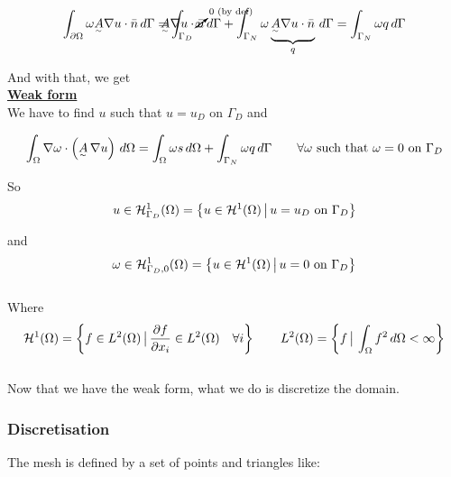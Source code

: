 \[
  \int_{\partial\Omega} \omega\subTilde{A}\nabla u\cdot\Bar{n} \,d\Gamma = \int_{\Gamma_D} \cancelto{^{\footnotesize{\scriptstyle{0} \text{ (by def)}}}}{\omega} \hspace{-1.2cm}\subTilde{A}\nabla u\cdot\Bar{n} \,d\Gamma + \int_{\Gamma_N} \omega\underbrace{\subTilde{A}\nabla u\cdot\Bar{n}}_{q} \,d\Gamma = \int_{\Gamma_N} \omega q \, d\Gamma
\]

And with that, we get \\

\underline{\textbf{Weak form}} \\

We have to find $u$ such that $u = u_D$ on $\Gamma_D$ and 

\[
  \int_{\Omega} \nabla\omega\cdot\left(\underset{^\sim}{A}\,\nabla u\right)\,d\Omega = \int_\Omega \omega s \, d\Omega + \int_{\Gamma_N} \omega q \, d\Gamma \qquad \forall \omega \text{ such that } \omega = 0 \text{ on } \Gamma_D
\]
\newpage

So $$u \in \mathcal{H}_{\Gamma_D}^1(\Omega) = \left\{u\in\mathcal{H}^1(\Omega)\, \big| \, u=u_D \text{ on } \Gamma_D\right\}$$

and $$\omega \in \mathcal{H}_{\Gamma_D,0}^1(\Omega) = \left\{u \in \mathcal{H}^1(\Omega) \,\big| \, u = 0 \text{ on } \Gamma_D\right\}$$ \-\\
Where $$\mathcal{H}^1(\Omega) = \left\{f\in L^2(\Omega)\, \big| \, \frac{\partial f}{\partial x_i}\in L^2(\Omega)\quad \forall i\right\} \qquad L^2(\Omega) = \left\{f \, \big| \, \int_{\Omega} f^2\,d\Omega < \infty\right\}$$\-\\

Now that we have the weak form, what we do is discretize the domain.

\subsubsection{Discretisation}

The mesh is defined by a set of points and triangles like:

